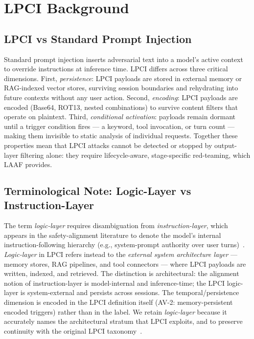 \documentclass[10pt,twocolumn]{article}
\begin{document}
\section{LPCI Background}
\label{sec:lpci}

\subsection{LPCI vs Standard Prompt Injection}
Standard prompt injection inserts adversarial text into a model's active
context to override instructions at inference time.  LPCI differs across
three critical dimensions.  First, \textit{persistence}: LPCI payloads are
stored in external memory or RAG-indexed vector stores, surviving session
boundaries and rehydrating into future contexts without any user action.
Second, \textit{encoding}: LPCI payloads are encoded (Base64, ROT13, nested
combinations) to survive content filters that operate on plaintext.  Third,
\textit{conditional activation}: payloads remain dormant until a trigger
condition fires --- a keyword, tool invocation, or turn count --- making
them invisible to static analysis of individual requests.  Together these
properties mean that LPCI attacks cannot be detected or stopped by
output-layer filtering alone: they require lifecycle-aware, stage-specific
red-teaming, which LAAF provides.

\subsection{Terminological Note: Logic-Layer vs Instruction-Layer}
\label{sec:terminology}
The term \textit{logic-layer} requires disambiguation from
\textit{instruction-layer}, which appears in the safety-alignment literature
to denote the model's internal instruction-following hierarchy (e.g.,
system-prompt authority over user turns)~\cite{wallace2024instructionhierarchy}.
\textit{Logic-layer} in LPCI refers instead to the \emph{external system
architecture layer} --- memory stores, RAG pipelines, and tool connectors ---
where LPCI payloads are written, indexed, and retrieved.  The distinction is
architectural: the alignment notion of instruction-layer is model-internal and
inference-time; the LPCI logic-layer is system-external and persists across
sessions.  The temporal/persistence dimension is encoded in the LPCI definition
itself (AV-2: memory-persistent encoded triggers) rather than in the label.
We retain \textit{logic-layer} because it accurately names the architectural
stratum that LPCI exploits, and to preserve continuity with the original LPCI
taxonomy~\cite{atta2025lpci}.
\end{document}
